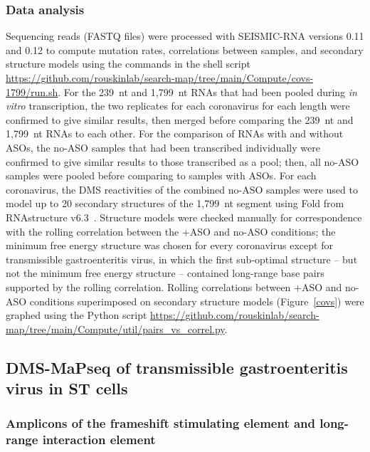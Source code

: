 \documentclass[main.tex]{subfiles}
\begin{document}
\subsubsection{Data analysis}

Sequencing reads (FASTQ files) were processed with SEISMIC-RNA versions 0.11 and 0.12 to compute mutation rates, correlations between samples, and secondary structure models using the commands in the shell script \url{https://github.com/rouskinlab/search-map/tree/main/Compute/covs-1799/run.sh}.
For the 239~nt and 1,799~nt RNAs that had been pooled during \textit{in vitro} transcription, the two replicates for each coronavirus for each length were confirmed to give similar results, then merged before comparing the 239~nt and 1,799~nt RNAs to each other.
For the comparison of RNAs with and without ASOs, the no-ASO samples that had been transcribed individually were confirmed to give similar results to those transcribed as a pool; then, all no-ASO samples were pooled before comparing to samples with ASOs.
For each coronavirus, the DMS reactivities of the combined no-ASO samples were used to model up to 20 secondary structures of the 1,799~nt segment using Fold from RNAstructure v6.3~\cite{Reuter2010}.
Structure models were checked manually for correspondence with the rolling correlation between the +ASO and no-ASO conditions; the minimum free energy structure was chosen for every coronavirus except for transmissible gastroenteritis virus, in which the first sub-optimal structure -- but not the minimum free energy structure -- contained long-range base pairs supported by the rolling correlation.
Rolling correlations between +ASO and no-ASO conditions superimposed on secondary structure models (Figure~\ref{covs}) were graphed using the Python script \url{https://github.com/rouskinlab/search-map/tree/main/Compute/util/pairs_vs_correl.py}.


\subsection{DMS-MaPseq of transmissible gastroenteritis virus in ST cells}

\subsubsection{Amplicons of the frameshift stimulating element and long-range interaction element}
\end{document}
